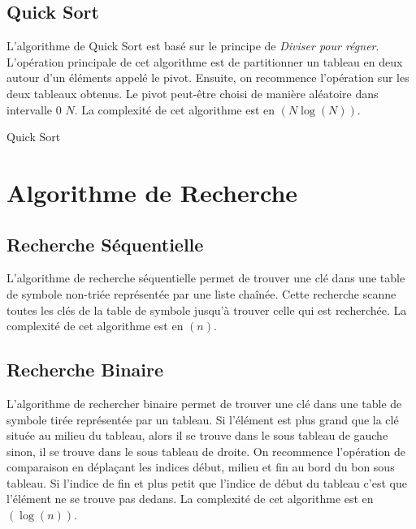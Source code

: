 \section{Quick Sort}
L'algorithme de Quick Sort est basé sur le principe de \emph{Diviser pour régner}. L'opération principale de cet algorithme est de partitionner un tableau en deux autour d'un éléments appelé le pivot. Ensuite, on recommence l'opération sur les deux tableaux obtenus. Le pivot peut-être choisi de manière aléatoire dans intervalle 0 $N$. La complexité de cet algorithme est en \bigO$(N\log(N))$. 
\begin{algorithm}
 
 \SetAlgoLined
 \caption{Quick Sort}
\end{algorithm}
\chapter{Algorithme de Recherche}
\section{Recherche Séquentielle}
L'algorithme de recherche séquentielle permet de trouver une clé dans une table de symbole non-triée représentée par une liste chaînée. Cette recherche scanne toutes les clés de la table de symbole jusqu'à trouver celle qui est recherchée. La complexité de cet algorithme est en \bigO$(n)$.
\section{Recherche Binaire}
L'algorithme de rechercher binaire permet de trouver une clé dans une table de symbole tirée représentée par un tableau. Si l'élément est plus grand que la clé située au milieu du tableau, alors il se trouve dans le sous tableau de gauche sinon, il se trouve dans le sous tableau de droite. On recommence l'opération de comparaison en déplaçant les indices début, milieu et fin au bord du bon sous tableau. Si l'indice de fin et plus petit que l'indice de début du tableau c'est que l'élément ne se trouve pas dedans. La complexité de cet algorithme est en \bigO$(\log(n))$.
